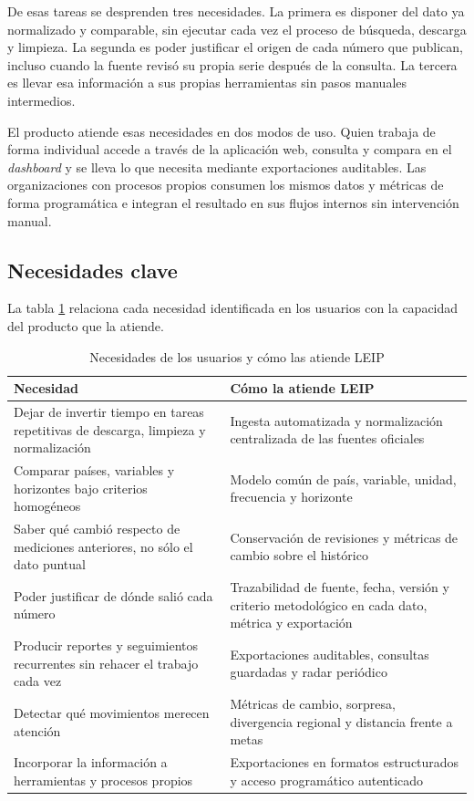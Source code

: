 \documentclass[11pt,a4paper]{article}
\newcommand{\proyectoNombre}{LEIP}
\begin{document}
De esas tareas se desprenden tres necesidades. La primera es disponer del dato
ya normalizado y comparable, sin ejecutar cada vez el proceso de b\'usqueda,
descarga y limpieza. La segunda es poder justificar el origen de cada n\'umero
que publican, incluso cuando la fuente revis\'o su propia serie despu\'es de la
consulta. La tercera es llevar esa informaci\'on a sus propias herramientas sin
pasos manuales intermedios.

El producto atiende esas necesidades en dos modos de uso. Quien trabaja de
forma individual accede a trav\'es de la aplicaci\'on web, consulta y compara
en el \emph{dashboard} y se lleva lo que necesita mediante exportaciones
auditables. Las organizaciones con procesos propios consumen los mismos datos y
m\'etricas de forma program\'atica e integran el resultado en sus flujos
internos sin intervenci\'on manual.

\subsection{Necesidades clave}

La tabla \ref{tab:necesidades} relaciona cada necesidad identificada en los
usuarios con la capacidad del producto que la atiende.

\begin{table}[htbp]
\centering
\caption{Necesidades de los usuarios y c\'omo las atiende \proyectoNombre{}}
\label{tab:necesidades}
\begin{tabularx}{\textwidth}{X X}
\toprule
\textbf{Necesidad} & \textbf{C\'omo la atiende \proyectoNombre{}} \\
\midrule
Dejar de invertir tiempo en tareas repetitivas de descarga, limpieza y
normalizaci\'on &
Ingesta automatizada y normalizaci\'on centralizada de las fuentes oficiales \\
\addlinespace
Comparar pa\'ises, variables y horizontes bajo criterios homog\'eneos &
Modelo com\'un de pa\'is, variable, unidad, frecuencia y horizonte \\
\addlinespace
Saber qu\'e cambi\'o respecto de mediciones anteriores, no s\'olo el dato puntual &
Conservaci\'on de revisiones y m\'etricas de cambio sobre el hist\'orico \\
\addlinespace
Poder justificar de d\'onde sali\'o cada n\'umero &
Trazabilidad de fuente, fecha, versi\'on y criterio metodol\'ogico en cada dato,
m\'etrica y exportaci\'on \\
\addlinespace
Producir reportes y seguimientos recurrentes sin rehacer el trabajo cada vez &
Exportaciones auditables, consultas guardadas y radar peri\'odico \\
\addlinespace
Detectar qu\'e movimientos merecen atenci\'on &
M\'etricas de cambio, sorpresa, divergencia regional y distancia frente a metas \\
\addlinespace
Incorporar la informaci\'on a herramientas y procesos propios &
Exportaciones en formatos estructurados y acceso program\'atico autenticado \\
\bottomrule
\end{tabularx}
\end{table}
\end{document}

